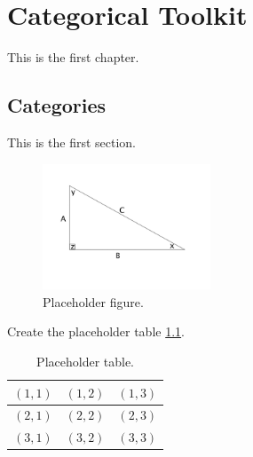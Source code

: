 \documentclass[12pt,a4paper,openright,twoside]{report}
\begin{document}
\listoffigures                         


\listoftables                           







\chapter{Categorical Toolkit}
\lhead[\fancyplain{}{\bfseries\thepage}]{\fancyplain{}{\bfseries\rightmark}}







  This is the first chapter.



  \section{Categories}                 
  This is the first section.

  \begin{figure}[h]
    \begin{center}                         
      \includegraphics[width=5cm]{figures/triangle.jpg}
      \caption[Placeholder]{Placeholder figure.}\label{fig:first}
    \end{center}
  \end{figure}

  Create the placeholder table \ref{tab:uno}.

  \begin{table}[h]                        
    \begin{center}                          
      \begin{tabular}{r|c|c}                  
        \hline \hline                           
        $(1,1)$ & $(1,2)$ & $(1,3)$\\           
        \hline                                  
        $(2,1)$ & $(2,2)$ & $(2,3)$\\           
        \hline                                  
        $(3,1)$ & $(3,2)$ & $(3,3)$\\
        \hline \hline                           
      \end{tabular}
      \caption[Placeholder Table]{Placeholder table.}\label{tab:uno}
    \end{center}
  \end{table}
\end{document}
